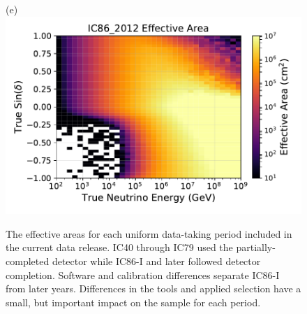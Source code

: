 \documentclass[aps,10pt,prd,twocolumn,floats,letterpaper,showpacs,nofootinbib,bibnotes,notitlepage,superscriptaddress,floatfix]{revtex4-1}
\begin{document}
\begin{figure}[t]
\begin{minipage}[c][6.5cm][c]{0.49\textwidth}
{(e)}\\\includegraphics[width=\linewidth]{./PublicReleasePlots/EffectiveAreaPlots/IC86_2012_effectiveArea.pdf}
\end{minipage}

\caption{The effective areas for each uniform data-taking period included in the current data release. IC40 through IC79 used the partially-completed detector while IC86-I and later followed detector completion. Software and calibration differences separate IC86-I from later years. Differences in the tools and applied selection have a small, but important impact on the sample for each period.}\label{fig:effA}
\end{figure}
\end{document}
